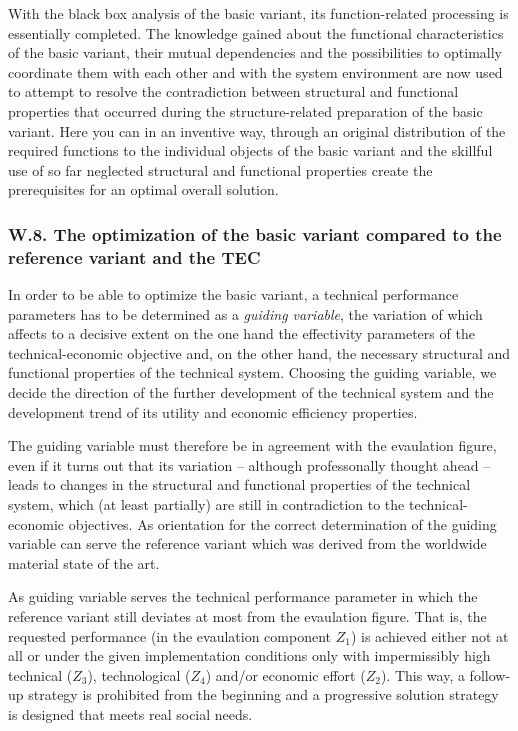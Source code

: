 \documentclass[11pt,a4paper]{article}
\begin{document}
With the black box analysis of the basic variant, its function-related
processing is essentially completed. The knowledge gained about the functional
characteristics of the basic variant, their mutual dependencies and the
possibilities to optimally coordinate them with each other and with the system
environment are now used to attempt to resolve the contradiction between
structural and functional properties that occurred during the
structure-related preparation of the basic variant.  Here you can in an
inventive way, through an original distribution of the required functions to
the individual objects of the basic variant and the skillful use of so far
neglected structural and functional properties create the prerequisites for an
optimal overall solution.

\subsubsection*{W.8. The optimization of the basic variant compared to the
  reference variant and the TEC}

In order to be able to optimize the basic variant, a technical performance
parameters has to be determined as a \emph{guiding variable}, the variation of
which affects to a decisive extent on the one hand the effectivity parameters
of the technical-economic objective and, on the other hand, the necessary
structural and functional properties of the technical system. Choosing the
guiding variable, we decide the direction of the further development of the
technical system and the development trend of its utility and economic
efficiency properties.

The guiding variable must therefore be in agreement with the evaulation figure,
even if it turns out that its variation -- although professonally thought
ahead -- leads to changes in the structural and functional properties of the
technical system, which (at least partially) are still in contradiction to the
technical-economic objectives. As orientation for the correct determination of
the guiding variable can serve the reference variant which was derived from
the worldwide material state of the art.

As guiding variable serves the technical performance parameter in which the
reference variant still deviates at most from the evaulation figure.  That is, the
requested performance (in the evaulation component $Z_1$) is achieved either not
at all or under the given implementation conditions only with impermissibly
high technical ($Z_3$), technological ($Z_4$) and/or economic effort ($Z_2$).
This way, a follow-up strategy is prohibited from the beginning and a
progressive solution strategy is designed that meets real social needs.
\end{document}
